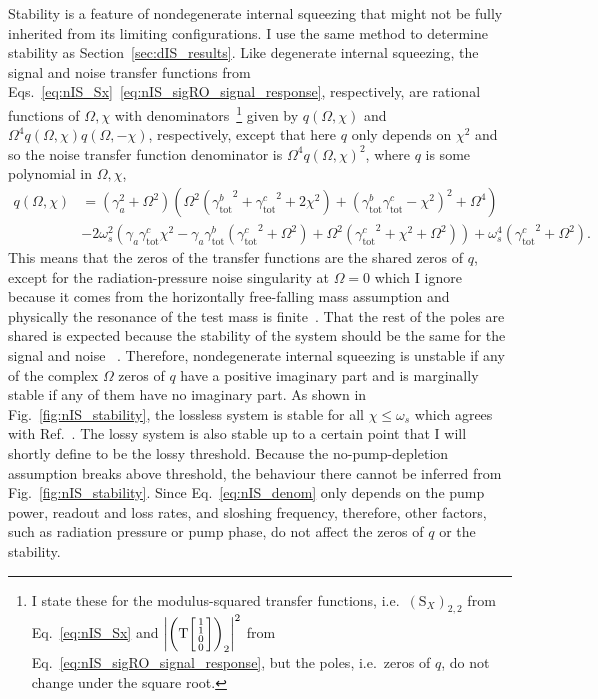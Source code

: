 Stability is a feature of nondegenerate internal squeezing that might not be fully inherited from its limiting configurations. I use the same method to determine stability as Section~\ref{sec:dIS_results}. Like degenerate internal squeezing, the signal and noise transfer functions from Eqs.~\ref{eq:nIS_Sx}~\ref{eq:nIS_sigRO_signal_response}, respectively, are rational functions of $\Omega, \chi$ with denominators~\footnote{I state these for the modulus-squared transfer functions, i.e.\ $(\text{S}_X)_{2,2}$ from Eq.~\ref{eq:nIS_Sx} and $\abs{\left(\text{T}\begin{bsmallmatrix}1 \\1\\0\\0\end{bsmallmatrix}\right)_2}^2$ from Eq.~\ref{eq:nIS_sigRO_signal_response}, but the poles, i.e.\ zeros of $q$, do not change under the square root.} given by $q(\Omega,\chi)$ and $\Omega^4 q(\Omega,\chi) q(\Omega,-\chi)$, respectively, except that here $q$ only depends on $\chi^2$ and so the noise transfer function denominator is $\Omega^4 q(\Omega,\chi)^2$, where $q$ is some polynomial in $\Omega, \chi$, 
\begin{align}\label{eq:nIS_denom}
q(\Omega,\chi)&=\left(\gamma_a^2+\Omega ^2\right) \left(\Omega ^2 \left({\gamma^b_\text{tot}}^2+{\gamma^c_\text{tot}}^2+2 \chi ^2\right)+\left({\gamma^b_\text{tot}} {\gamma^c_\text{tot}}-\chi ^2\right)^2+\Omega ^4\right)\\
&-2 \omega_s^2 \left(\gamma_a {\gamma^c_\text{tot}} \chi ^2-\gamma_a {\gamma^b_\text{tot}} \left({\gamma^c_\text{tot}}^2+\Omega ^2\right)+\Omega ^2 \left({\gamma^c_\text{tot}}^2+\chi ^2+\Omega ^2\right)\right)+\omega_s^4 \left({\gamma^c_\text{tot}}^2+\Omega ^2\right).\nonumber
\end{align}
This means that the zeros of the transfer functions are the shared zeros of $q$, except for the radiation-pressure noise singularity at $\Omega=0$ which I ignore because it comes from the horizontally free-falling mass assumption and physically the resonance of the test mass is finite~\cite{}. That the rest of the poles are shared is expected because the stability of the system should be the same for the signal and noise ~\cite{}.
Therefore, nondegenerate internal squeezing is unstable if any of the complex $\Omega$ zeros of $q$ have a positive imaginary part and is marginally stable if any of them have no imaginary part. As shown in Fig.~\ref{fig:nIS_stability}, the lossless system is stable for all $\chi\leq\omega_s$ which agrees with Ref.~\cite{liBroadbandSensitivityImprovement2020}. The lossy system is also stable up to a certain point that I will shortly define to be the lossy threshold. Because the no-pump-depletion assumption breaks above threshold, the behaviour there cannot be inferred from Fig.~\ref{fig:nIS_stability}.
Since Eq.~\ref{eq:nIS_denom} only depends on the pump power, readout and loss rates, and sloshing frequency, therefore, other factors, such as radiation pressure or pump phase, do not affect the zeros of $q$ or the stability.

